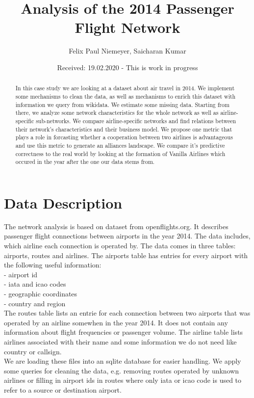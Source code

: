 \documentclass[twocolumn]{tum-article}
\title{Analysis of the 2014 Passenger Flight Network}
\author{Felix Paul Niemeyer\authormark{1},
	Saicharan Kumar\authormark{2}}
\affil[1]{felix.niemeyer@tum.de, MiM}
\affil[2]{saicharan.kumar@tum.de, MiM}
\date{Received: 19.02.2020 - This is work in progress}
\begin{document}
\maketitle

\begin{abstract}
	In this case study we are looking at a dataset about air travel in 2014. We implement some mechanisms to clean the data, as well as mechanisms to enrich this dataset with information we query from wikidata. We estimate some missing data. Starting from there, we analyze some network characteristics for the whole network as well as airline-specific sub-networks. We compare airline-specific networks and find relations between their network's characteristics and their business model. We propose one metric that plays a role in forcasting whether a cooperation between two airlines is advantageous and use this metric to generate an alliances landscape. We compare it's predictive correctness to the real world by looking at the formation of Vanilla Airlines which occured in the year after the one our data stems from. 
\end{abstract}

\section{Data Description}
The network analysis is based on dataset from openflights.org. 
It describes passenger flight connections between airports in the year 2014. 
The data includes, which airline each connection is operated by.
The data comes in three tables: airports, routes and airlines. 
The airports table has entries for every airport with the following useful information: \\
- airport id\\
- iata and icao codes\\
- geographic coordinates\\
- country and region\\

The routes table lists an entrie for each connection between two airports that was operated by an airline somewhen in the year 2014. It does not contain any information about flight frequencies or passenger volume. The airline table lists airlines associated with their name and some information we do not need like country or callsign. \\

We are loading these files into an sqlite database for easier handling. 
We apply some queries for cleaning the data, e.g. removing routes operated by unknown airlines or filling in airport ids in routes where only iata or icao code is used to refer to a source or destination airport. \\
\end{document}
